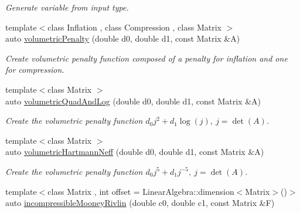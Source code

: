 \begin{DoxyCompactItemize}
\begin{DoxyCompactList}\small\item\em Generate variable from input type. \end{DoxyCompactList}\item 
\hypertarget{namespaceRFFGen_acecd1bb1423c34a46a1bb55f6c79d65f}{{\footnotesize template$<$class Inflation , class Compression , class Matrix $>$ }\\auto \hyperlink{namespaceRFFGen_acecd1bb1423c34a46a1bb55f6c79d65f}{volumetric\-Penalty} (double d0, double d1, const Matrix \&A)}\label{namespaceRFFGen_acecd1bb1423c34a46a1bb55f6c79d65f}

\begin{DoxyCompactList}\small\item\em Create volumetric penalty function composed of a penalty for inflation and one for compression. \end{DoxyCompactList}\item 
\hypertarget{namespaceRFFGen_a78a0e5bc2796da63afa6a1ce529975e8}{{\footnotesize template$<$class Matrix $>$ }\\auto \hyperlink{namespaceRFFGen_a78a0e5bc2796da63afa6a1ce529975e8}{volumetric\-Quad\-And\-Log} (double d0, double d1, const Matrix \&A)}\label{namespaceRFFGen_a78a0e5bc2796da63afa6a1ce529975e8}

\begin{DoxyCompactList}\small\item\em Create the volumetric penalty function $ d_0 j^2 + d_1 \log(j),\ j=\det(A) $. \end{DoxyCompactList}\item 
\hypertarget{namespaceRFFGen_a18b1b3749e9292f521920a9cded87ca7}{{\footnotesize template$<$class Matrix $>$ }\\auto \hyperlink{namespaceRFFGen_a18b1b3749e9292f521920a9cded87ca7}{volumetric\-Hartmann\-Neff} (double d0, double d1, const Matrix \&A)}\label{namespaceRFFGen_a18b1b3749e9292f521920a9cded87ca7}

\begin{DoxyCompactList}\small\item\em Create the volumetric penalty function $ d_0 j^5 + d_1 j^{-5},\ j=\det(A) $. \end{DoxyCompactList}\item 
\hypertarget{group__Rubber_ga8626dcc0c5d11d3d2d796d09457e5e5d}{{\footnotesize template$<$class Matrix , int offset = Linear\-Algebra\-::dimension$<$\-Matrix$>$()$>$ }\\auto \hyperlink{group__Rubber_ga8626dcc0c5d11d3d2d796d09457e5e5d}{incompressible\-Mooney\-Rivlin} (double c0, double c1, const Matrix \&F)}\label{group__Rubber_ga8626dcc0c5d11d3d2d796d09457e5e5d}


\end{DoxyCompactItemize}
